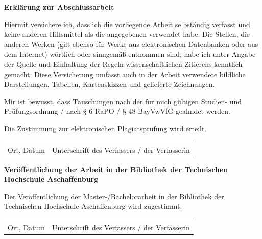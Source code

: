 
\newpage
\thispagestyle{empty}
   \textbf{Erklärung zur Abschlussarbeit}

   Hiermit versichere ich, dass ich die vorliegende Arbeit selbständig verfasst
   und keine anderen Hilfsmittel als die angegebenen verwendet habe.
   Die Stellen, die anderen Werken
   (gilt ebenso für Werke aus elektronischen Datenbanken oder aus dem Internet)
   wörtlich oder sinngemäß entnommen sind, habe ich unter Angabe der Quelle
   und Einhaltung der Regeln wissenschaftlichen Zitierens kenntlich gemacht.
   Diese Versicherung umfasst auch in der Arbeit verwendete bildliche Darstellungen,
   Tabellen, Kartenskizzen und gelieferte Zeichnungen.

   Mir ist bewusst, dass Täuschungen nach der für mich gültigen Studien- und
   Prüfungsordnung / nach § 6 RaPO / § 48 BayVwVfG geahndet werden.

   Die Zustimmung zur elektronischen Plagiatsprüfung wird erteilt.
   \vspace{1.5cm}

   \begin{tabular}{@{}p{3.5cm}p{7cm}@{}}
    \hrulefill & \hrulefill \\
    Ort, Datum & Unterschrift des Verfassers / der Verfasserin \\
   \end{tabular}

   \vspace{1cm}
   \textbf{Veröffentlichung der Arbeit in der Bibliothek der Technischen Hochschule Aschaffenburg}

   Der Veröffentlichung der Master-/Bachelorarbeit in der Bibliothek
   der Technischen Hochschule Aschaffenburg wird zugestimmt.
   \vspace{1.5cm}

   \begin{tabular}{@{}p{3.5cm}p{7cm}@{}}
    \hrulefill & \hrulefill \\
    Ort, Datum & Unterschrift des Verfassers / der Verfasserin \\
   \end{tabular}

